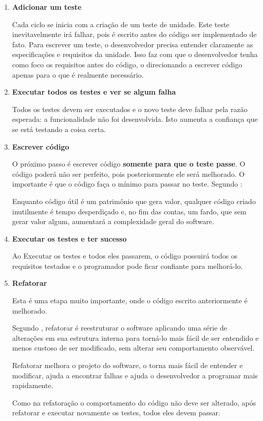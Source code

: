 \begin{enumerate}
\item \textbf{Adicionar um teste}

Cada ciclo se inicia com a criação de um teste de unidade. Este teste inevitavelmente irá falhar, pois é escrito antes do código ser implementado de fato. Para escrever um teste, o desenvolvedor precisa entender claramente as especificações e requisitos da unidade. Isso faz com que o desenvolvedor tenha como foco os requisitos antes do código, o direcionando a escrever código apenas para o que é realmente necessário.

\item \textbf{Executar todos os testes e ver se algum falha}

Todos os testes devem ser executados e o novo teste deve falhar pela razão esperada: a funcionalidade não foi desenvolvida. Isto aumenta a confiança que se está testando a coisa certa.

\item \textbf{Escrever código}

O próximo passo é escrever código \textbf{somente para que o teste passe}. O código poderá não ser perfeito, pois posteriormente ele será melhorado. O importante é que o código faça o mínimo para passar no teste. Segundo :

\begin{citacao}
Enquanto código útil é um patrimônio que gera valor, qualquer código criado inutilmente é tempo desperdiçado e, no fim das contas, um fardo, que sem gerar valor algum, aumentará a complexidade geral do software.
\end{citacao}

\item \textbf{Executar os testes e ter sucesso}

Ao Executar os testes e todos eles passarem, o código possuirá todos os requisitos testados e o programador pode ficar confiante para melhorá-lo.

\item \textbf{Refatorar}

Esta é uma etapa muito importante, onde o código escrito anteriormente é melhorado.

Segundo , refatorar é reestruturar o software aplicando uma série de alterações em sua estrutura interna para torná-lo mais fácil de ser entendido e menos custoso de ser modificado, sem alterar seu comportamento observável.

Refatorar melhora o projeto do software, o torna mais fácil de entender e modificar, ajuda a encontrar falhas e ajuda o desenvolvedor a programar mais rapidamente.

Como na refatoração o comportamento do código não deve ser alterado, após refatorar e executar novamente os testes, todos eles devem passar.

\end{enumerate}

